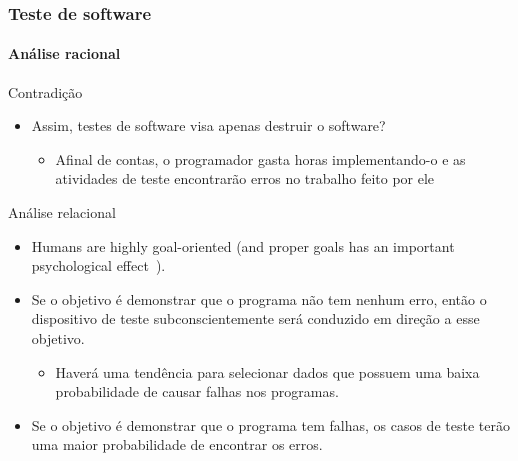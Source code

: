 \begin{frame}
\frametitle{Teste de software}
\framesubtitle{Análise racional}

\begin{block:fact}{Contradição}
\begin{itemize}
	\item Assim, testes de software visa apenas destruir o software?
	\begin{itemize}
		\item Afinal de contas, o programador gasta horas implementando-o e as atividades de teste encontrarão erros no trabalho feito por ele
	\end{itemize}
\end{itemize}
\end{block:fact}

\begin{block:fact}{Análise relacional}
\begin{itemize}
	\item Humans are highly goal-oriented (and proper goals has an important
	psychological effect~\cite[p. 6]{myers:2004}).

	\item Se o objetivo é demonstrar que o programa não tem nenhum erro, então o dispositivo de teste subconscientemente será conduzido em direção a esse objetivo.
	\begin{itemize}
		\item Haverá uma tendência para selecionar dados que possuem uma baixa probabilidade de causar falhas nos programas.
	\end{itemize}

	\item Se o objetivo é demonstrar que o programa tem falhas, os casos de teste terão uma maior probabilidade de encontrar os erros.
\end{itemize}
\end{block:fact}
\end{frame}



